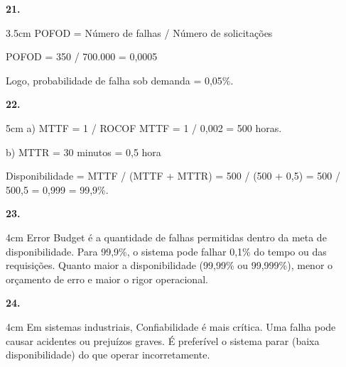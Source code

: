 \documentclass[12pt]{article}
\begin{document}
\textbf{21.}
\begin{resposta}{3.5cm}
POFOD = Número de falhas / Número de solicitações  

POFOD = 350 / 700.000  
= 0,0005  

Logo, probabilidade de falha sob demanda = 0,05\%.
\end{resposta}

\textbf{22.}
\begin{resposta}{5cm}
a) MTTF = 1 / ROCOF  
MTTF = 1 / 0,002 = 500 horas.

b) MTTR = 30 minutos = 0,5 hora  

Disponibilidade = MTTF / (MTTF + MTTR)  
= 500 / (500 + 0,5)  
= 500 / 500,5  
= 0,999 = 99,9\%.
\end{resposta}

\textbf{23.}
\begin{resposta}{4cm}
Error Budget é a quantidade de falhas permitidas dentro da meta de disponibilidade.  
Para 99,9\%, o sistema pode falhar 0,1\% do tempo ou das requisições.  
Quanto maior a disponibilidade (99,99\% ou 99,999\%), menor o orçamento de erro e maior o rigor operacional.
\end{resposta}

\textbf{24.}
\begin{resposta}{4cm}
Em sistemas industriais, Confiabilidade é mais crítica.  
Uma falha pode causar acidentes ou prejuízos graves.  
É preferível o sistema parar (baixa disponibilidade) do que operar incorretamente.
\end{resposta}
\end{document}
